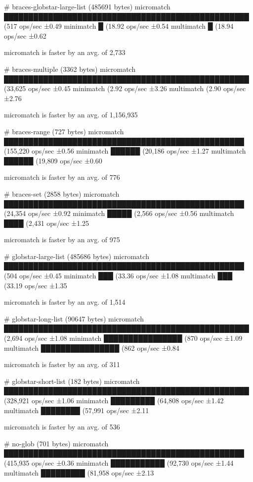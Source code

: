 {\itshape 
\begin{DoxyCode}
# braces-globstar-large-list (485691 bytes)
  micromatch ██████████████████████████████████████████████████ (517 ops/sec ±0.49%
  minimatch  █ (18.92 ops/sec ±0.54%
  multimatch █ (18.94 ops/sec ±0.62%

  micromatch is faster by an avg. of 2,733%

# braces-multiple (3362 bytes)
  micromatch ██████████████████████████████████████████████████ (33,625 ops/sec ±0.45%
  minimatch   (2.92 ops/sec ±3.26%
  multimatch  (2.90 ops/sec ±2.76%

  micromatch is faster by an avg. of 1,156,935%

# braces-range (727 bytes)
  micromatch █████████████████████████████████████████████████ (155,220 ops/sec ±0.56%
  minimatch  ██████ (20,186 ops/sec ±1.27%
  multimatch ██████ (19,809 ops/sec ±0.60%

  micromatch is faster by an avg. of 776%

# braces-set (2858 bytes)
  micromatch █████████████████████████████████████████████████ (24,354 ops/sec ±0.92%
  minimatch  █████ (2,566 ops/sec ±0.56%
  multimatch ████ (2,431 ops/sec ±1.25%

  micromatch is faster by an avg. of 975%

# globstar-large-list (485686 bytes)
  micromatch █████████████████████████████████████████████████ (504 ops/sec ±0.45%
  minimatch  ███ (33.36 ops/sec ±1.08%
  multimatch ███ (33.19 ops/sec ±1.35%

  micromatch is faster by an avg. of 1,514%

# globstar-long-list (90647 bytes)
  micromatch ██████████████████████████████████████████████████ (2,694 ops/sec ±1.08%
  minimatch  ████████████████ (870 ops/sec ±1.09%
  multimatch ████████████████ (862 ops/sec ±0.84%

  micromatch is faster by an avg. of 311%

# globstar-short-list (182 bytes)
  micromatch ██████████████████████████████████████████████████ (328,921 ops/sec ±1.06%
  minimatch  █████████ (64,808 ops/sec ±1.42%
  multimatch ████████ (57,991 ops/sec ±2.11%

  micromatch is faster by an avg. of 536%

# no-glob (701 bytes)
  micromatch █████████████████████████████████████████████████ (415,935 ops/sec ±0.36%
  minimatch  ███████████ (92,730 ops/sec ±1.44%
  multimatch █████████ (81,958 ops/sec ±2.13%


\end{DoxyCode}}
